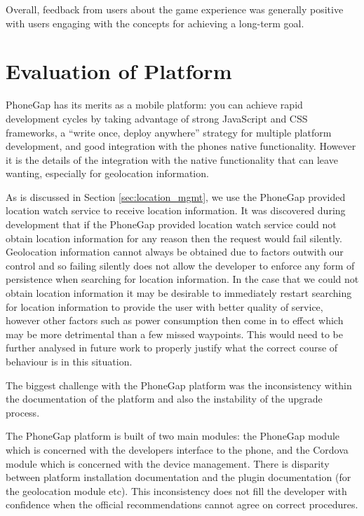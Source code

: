 Overall, feedback from users about the game experience was generally
positive with users engaging with the concepts for achieving a
long-term goal.  

\section{Evaluation of Platform}
PhoneGap has its merits as a mobile platform: you can achieve rapid
development cycles by taking advantage of strong JavaScript and CSS
frameworks, a ``write once, deploy anywhere'' strategy for multiple
platform development, and good integration with the phones native
functionality. However it is the details of the integration with the
native functionality that can leave wanting, especially for
geolocation information.

As is discussed in Section \ref{sec:location_mgmt}, we use the PhoneGap
provided location watch service to receive location information. It
was discovered during development that if the PhoneGap provided
location watch service could not obtain location information for any
reason then the request would fail silently. Geolocation information
cannot always be obtained due to factors outwith our control and so
failing silently does not allow the developer to enforce any form of
persistence when searching for location information. In the case that
we could not obtain location information it may be desirable to
immediately restart searching for location information to provide the
user with better quality of service, however other factors such as
power consumption then come in to effect which may be more detrimental
than a few missed waypoints. This would need to be further analysed in
future work to properly justify what the correct course of behaviour
is in this situation.

The biggest challenge with the PhoneGap platform was the inconsistency
within the documentation of the platform and also the instability of
the upgrade process. 

The PhoneGap platform is built of two main modules: the PhoneGap
module which is concerned with the developers interface to the phone,
and the Cordova module which is concerned with the device management.
There is disparity between platform installation documentation and the
plugin documentation (for the geolocation module
etc)\cite{phonegap_install, phonegap_cli,
  phonegap_geolocationAccessingFeature}. This inconsistency does not
fill the developer with confidence when the official recommendations
cannot agree on correct procedures. 

